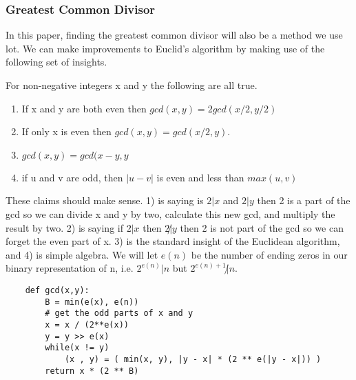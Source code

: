\documentclass{article}
\begin{document}
\subsubsection{Greatest Common Divisor}
In this paper, finding the greatest common divisor will also be a method we use lot. We can make improvements to Euclid's algorithm by making use of the following set of insights.
\begin{theorem}
    For non-negative integers x and y the following are all true.
    \begin{enumerate}
        \item If x and y are both even then $gcd(x,y) = 2 gcd(x/2, y/2)$
        \item If only x is even then $gcd(x,y) = gcd(x/2, y)$.
        \item $gcd(x,y) = gcd(x-y, y$
        \item if u and v are odd, then $| u - v|$ is even and less than $max(u,v)$
    \end{enumerate}\cite{stein1967computational} \cite{knuth1997art}
\end{theorem}
These claims should make sense. 1) is saying is $2|x$ and $2|y$ then 2 is a part of the gcd so we can divide x and y by two, calculate this new gcd, and multiply the result by two. 2) is saying if $2| x$ then $2 \not | y$ then 2 is not part of the gcd so we can forget the even part of x. 3) is the standard insight of the Euclidean algorithm, and 4) is simple algebra. We will let $e(n)$ be the number of ending zeros in our binary representation of n, i.e. $2^{e(n)} | n$ but $2^{e(n) + 1} \not | n$.  
\begin{verbatim}
    def gcd(x,y):
        B = min(e(x), e(n))
        # get the odd parts of x and y
        x = x / (2**e(x))
        y = y >> e(x)
        while(x != y)
            (x , y) = ( min(x, y), |y - x| * (2 ** e(|y - x|)) )
        return x * (2 ** B)
\end{verbatim}

\end{document}
